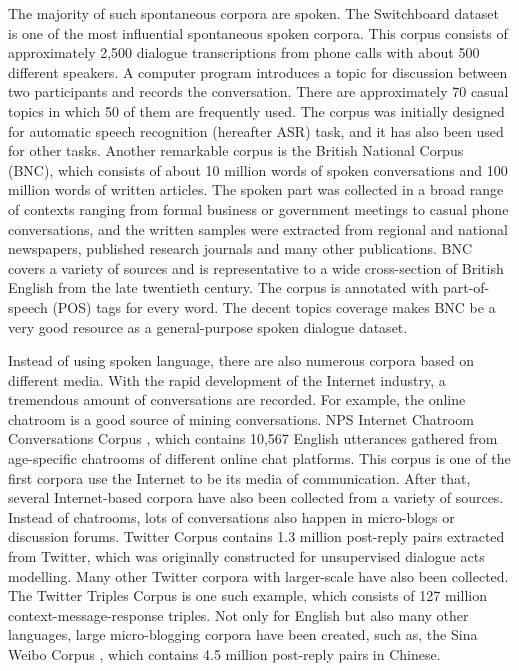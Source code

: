 \documentclass[bsc,frontabs,twoside,singlespacing,parskip,deptreport]{infthesis}     %
\begin{document}
The majority of such spontaneous corpora are spoken. The Switchboard dataset \cite{godfrey1992switchboard} is one of the most influential spontaneous spoken corpora. This corpus consists of approximately 2,500 dialogue transcriptions from phone calls with about 500 different speakers. A computer program introduces a topic for discussion between two participants and records the conversation. There are approximately 70 casual topics in which 50 of them are frequently used. The corpus was initially designed for automatic speech recognition (hereafter ASR) task, and it has also been used for other tasks. Another remarkable corpus is the British National Corpus \cite{leech1992100} (BNC), which consists of about 10 million words of spoken conversations and 100 million words of written articles. The spoken part was collected in a broad range of contexts ranging from formal business or government meetings to casual phone conversations, and the written samples were extracted from regional and national newspapers, published research journals and many other publications. BNC covers a variety of sources and is representative to a wide cross-section of British English from the late twentieth century. The corpus is annotated with part-of-speech (POS) tags for every word. The decent topics coverage makes BNC be a very good resource as a general-purpose spoken dialogue dataset. 

Instead of using spoken language, there are also numerous corpora based on different media. With the rapid development of the Internet industry, a tremendous amount of conversations are recorded. For example, the online chatroom is a good source of mining conversations. NPS Internet Chatroom Conversations Corpus \cite{forsythand2007lexical}, which contains 10,567 English utterances gathered from age-specific chatrooms of different online chat platforms. This corpus is one of the first corpora use the Internet to be its media of communication. After that, several Internet-based corpora have also been collected from a variety of sources. Instead of chatrooms, lots of conversations also happen in micro-blogs or discussion forums. Twitter Corpus \cite{ritter2010unsupervised} contains 1.3 million post-reply pairs extracted from Twitter, which was originally constructed for unsupervised dialogue acts modelling. Many other Twitter corpora with larger-scale have also been collected. The Twitter Triples Corpus \cite{sordoni2015neural} is one such example, which consists of 127 million context-message-response triples. Not only for English but also many other languages, large micro-blogging corpora have been created, such as, the Sina Weibo Corpus \cite{shang2015neural}, which contains 4.5 million post-reply pairs in Chinese.
\end{document}

